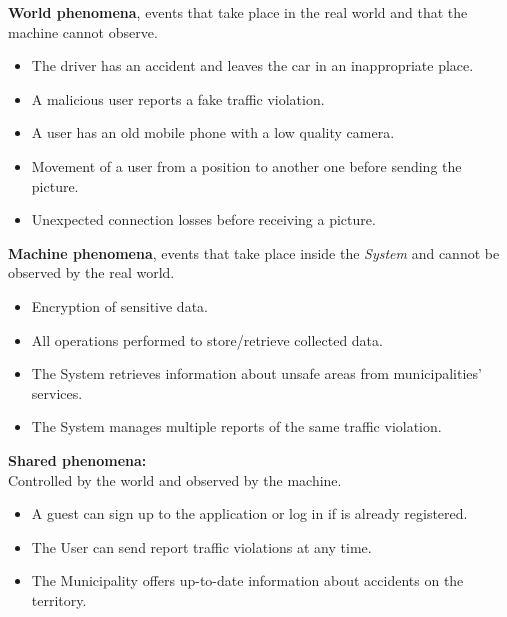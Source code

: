     
    \noindent\textbf{World phenomena}, events that take place in the real world and that the machine cannot observe.
    \begin{itemize}
      \item The driver has an accident and leaves the car in an inappropriate place.
      \item A malicious user reports a fake traffic violation.
      \item A user has an old mobile phone with a low quality camera.
      \item Movement of a user from a position to another one before sending the picture.
      \item Unexpected connection losses before receiving a picture.
    \end{itemize}
    \vspace{0.5cm}
    
    \noindent\textbf{Machine phenomena}, events that take place inside the \textit{System} and cannot be observed by the real world.
    \begin{itemize}
      \item Encryption of sensitive data.
      \item All operations performed to store/retrieve collected data.
      \item The System retrieves information about unsafe areas from municipalities' services.
      \item The System manages multiple reports of the same traffic violation.
    \end{itemize}
    \vspace{0.5cm}
    
    \noindent\textbf{Shared phenomena:}\\\newline
    Controlled by the world and observed by the machine.
    \begin{itemize}
      \item A guest can sign up to the application or log in if is already registered.
      \item The User can send report traffic violations at any time.
      \item The Municipality offers up-to-date information about accidents on the territory.
    \end{itemize}
    
